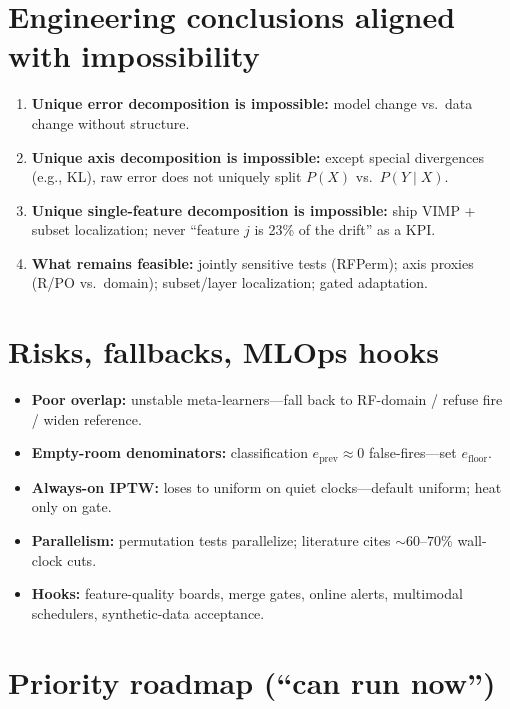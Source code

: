 \documentclass[11pt,a4paper]{article}
\begin{document}
\section{Engineering conclusions aligned with impossibility}
\label{sec:impossibility}

\begin{enumerate}
  \item \textbf{Unique error decomposition is impossible:} model change vs.\ data change without structure.
  \item \textbf{Unique axis decomposition is impossible:} except special divergences (e.g., KL), raw error does not uniquely split \(P(X)\) vs.\ \(P(Y\mid X)\).
  \item \textbf{Unique single-feature decomposition is impossible:} ship VIMP + subset localization; never ``feature \(j\) is 23\% of the drift'' as a KPI.
  \item \textbf{What remains feasible:} jointly sensitive tests (RFPerm); axis proxies (R/PO vs.\ domain); subset/layer localization; gated adaptation.
\end{enumerate}

\section{Risks, fallbacks, MLOps hooks}
\label{sec:mlops}

\begin{itemize}
  \item \textbf{Poor overlap:} unstable meta-learners---fall back to RF-domain / refuse fire / widen reference.
  \item \textbf{Empty-room denominators:} classification \(e_{\mathrm{prev}}\approx 0\) false-fires---set \(e_{\mathrm{floor}}\).
  \item \textbf{Always-on IPTW:} loses to uniform on quiet clocks---default uniform; heat only on gate.
  \item \textbf{Parallelism:} permutation tests parallelize; literature cites \(\sim 60\)--\(70\%\) wall-clock cuts.
  \item \textbf{Hooks:} feature-quality boards, merge gates, online alerts, multimodal schedulers, synthetic-data acceptance.
\end{itemize}

\section{Priority roadmap (``can run now'')}
\label{sec:roadmap}
\end{document}
